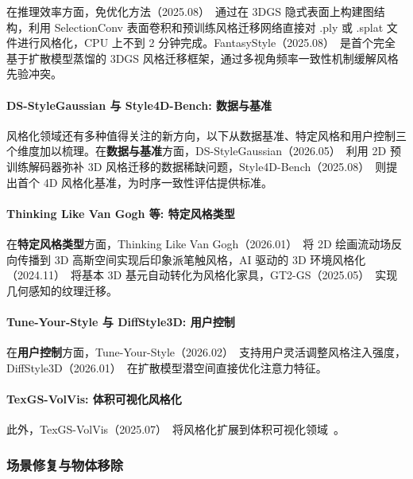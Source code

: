 在推理效率方面，免优化方法（2025.08）~\cite{2508_05813}通过在 3DGS 隐式表面上构建图结构，利用 SelectionConv 表面卷积和预训练风格迁移网络直接对 .ply 或 .splat 文件进行风格化，CPU 上不到 2 分钟完成。FantasyStyle（2025.08）~\cite{2508_08136}是首个完全基于扩散模型蒸馏的 3DGS 风格迁移框架，通过多视角频率一致性机制缓解风格先验冲突。

\paragraph{DS-StyleGaussian 与 Style4D-Bench: 数据与基准}

风格化领域还有多种值得关注的新方向，以下从数据基准、特定风格和用户控制三个维度加以梳理。在\textbf{数据与基准}方面，DS-StyleGaussian（2026.05）~\cite{2605_30065}利用 2D 预训练解码器弥补 3D 风格迁移的数据稀缺问题，Style4D-Bench（2025.08）~\cite{2508_19243}则提出首个 4D 风格化基准，为时序一致性评估提供标准。

\paragraph{Thinking Like Van Gogh 等: 特定风格类型}

在\textbf{特定风格类型}方面，Thinking Like Van Gogh（2026.01）~\cite{2601_10075}将 2D 绘画流动场反向传播到 3D 高斯空间实现后印象派笔触风格，AI 驱动的 3D 环境风格化（2024.11）~\cite{2411_06067}将基本 3D 基元自动转化为风格化家具，GT2-GS（2025.05）~\cite{2505_15208}实现几何感知的纹理迁移。

\paragraph{Tune-Your-Style 与 DiffStyle3D: 用户控制}

在\textbf{用户控制}方面，Tune-Your-Style（2026.02）~\cite{2602_00618}支持用户灵活调整风格注入强度，DiffStyle3D（2026.01）~\cite{2601_19717}在扩散模型潜空间直接优化注意力特征。

\paragraph{TexGS-VolVis: 体积可视化风格化}

此外，TexGS-VolVis（2025.07）~\cite{2507_13586}将风格化扩展到体积可视化领域~\cite{2604_09639,2605_00498}。

\subsubsection{场景修复与物体移除}

